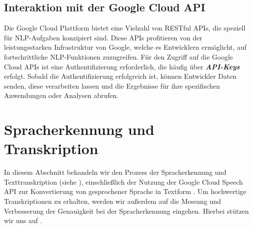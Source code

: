 \documentclass[12pt,a4paper]{article}
\begin{document}
\subsection{Interaktion mit der Google Cloud API}
Die Google Cloud Plattform bietet eine Vielzahl von RESTful APIs, die speziell für NLP-Aufgaben konzipiert sind. Diese APIs profitieren von der leistungsstarken Infrastruktur von Google, welche es Entwicklern ermöglicht, auf fortschrittliche NLP-Funktionen zuzugreifen. Für den Zugriff auf die Google Cloud APIs ist eine Authentifizierung erforderlich, die häufig über \textbf{\textit{API-Keys}} erfolgt. Sobald die Authentifizierung erfolgreich ist, können Entwickler Daten senden, diese verarbeiten lassen und die Ergebnisse für ihre spezifischen Anwendungen oder Analysen abrufen.


\newpage

\section{Spracherkennung und Transkription}
In diesem Abschnitt behandeln wir den Prozess der Spracherkennung und Texttranskription (siehe \cite{towards}), einschließlich der Nutzung der Google Cloud Speech API zur Konvertierung von gesprochener Sprache in Textform \cite{speechtotext2023}. Um hochwertige Transkriptionen zu erhalten, werden wir außerdem auf die Messung und Verbesserung der Genauigkeit bei der Spracherkennung eingehen. Hierbei stützen wir uns auf \cite{speechaccuracy2023}.
\end{document}
